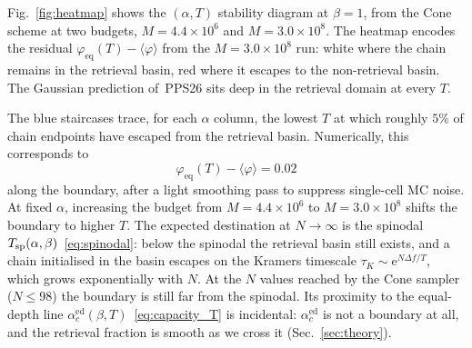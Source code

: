\documentclass[letterpaper]{article} %
\newcommand{\e}{{\mathrm{e}}}
\newcommand{\Bnet}{\beta}
\newcommand{\acEd}{\alpha_c^{\mathrm{ed}}}
\begin{document}

Fig.~\ref{fig:heatmap} shows the $(\alpha, T)$ stability diagram at $\Bnet = 1$, from the Cone scheme at two budgets, $M = 4.4 \times 10^6$ and $M = 3.0 \times 10^8$. The heatmap encodes the residual $\varphi_{\mathrm{eq}}(T) - \langle\varphi\rangle$ from the $M = 3.0 \times 10^8$ run: white where the chain remains in the retrieval basin, red where it escapes to the non-retrieval basin. The Gaussian prediction of~PPS26 sits deep in the retrieval domain at every $T$.

The blue staircases trace, for each $\alpha$ column, the lowest $T$ at which roughly $5\%$ of chain endpoints have escaped from the retrieval basin. Numerically, this corresponds to 
\begin{equation}
    \varphi_{\mathrm{eq}}(T) - \langle\varphi\rangle = 0.02 
    \label{eq:threshold}
\end{equation} 
along the boundary, after a light smoothing pass to suppress single-cell MC noise.
At fixed $\alpha$, increasing the budget from $M = 4.4 \times 10^6$ to $M = 3.0 \times 10^8$ shifts the boundary to higher $T$. The expected destination at $N \to \infty$ is the spinodal $T_{\rm sp}(\alpha, \Bnet)$~\eqref{eq:spinodal}: below the spinodal the retrieval basin still exists, and a chain initialised in the basin escapes on the Kramers timescale $\tau_K \sim \e^{N \Delta f / T}$, which grows exponentially with $N$. At the $N$ values reached by the Cone sampler ($N \leq 98$) the boundary is still far from the spinodal. Its proximity to the equal-depth line $\acEd(\Bnet, T)$~\eqref{eq:capacity_T} is incidental: $\acEd$ is not a boundary at all, and the retrieval fraction is smooth as we cross it (Sec.~\ref{sec:theory}). 
\end{document}
